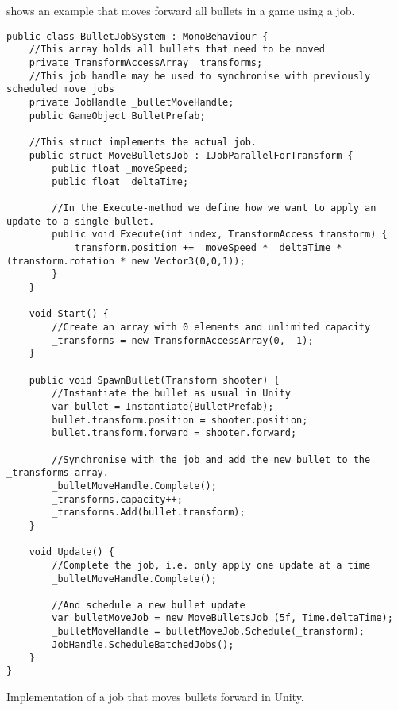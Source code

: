  shows an example that moves forward all bullets in a game using a job.
\begin{listing}[H]
\begin{verbatim}
public class BulletJobSystem : MonoBehaviour {
    //This array holds all bullets that need to be moved
    private TransformAccessArray _transforms;
    //This job handle may be used to synchronise with previously scheduled move jobs
    private JobHandle _bulletMoveHandle;
    public GameObject BulletPrefab;

    //This struct implements the actual job.
    public struct MoveBulletsJob : IJobParallelForTransform {
        public float _moveSpeed;
        public float _deltaTime;

        //In the Execute-method we define how we want to apply an update to a single bullet.
        public void Execute(int index, TransformAccess transform) {
            transform.position += _moveSpeed * _deltaTime * (transform.rotation * new Vector3(0,0,1));
        }
    }

    void Start() {
        //Create an array with 0 elements and unlimited capacity
        _transforms = new TransformAccessArray(0, -1);
    }

    public void SpawnBullet(Transform shooter) {
        //Instantiate the bullet as usual in Unity
        var bullet = Instantiate(BulletPrefab);
        bullet.transform.position = shooter.position;
        bullet.transform.forward = shooter.forward;

        //Synchronise with the job and add the new bullet to the _transforms array.
        _bulletMoveHandle.Complete();
        _transforms.capacity++;
        _transforms.Add(bullet.transform);
    }

    void Update() {
        //Complete the job, i.e. only apply one update at a time
        _bulletMoveHandle.Complete();

        //And schedule a new bullet update
        var bulletMoveJob = new MoveBulletsJob (5f, Time.deltaTime);
        _bulletMoveHandle = bulletMoveJob.Schedule(_transform);
        JobHandle.ScheduleBatchedJobs();
    }
}
\end{verbatim}
\caption{Implementation of a job that moves bullets forward in Unity.} \label{lst:unity:job:example}
\end{listing}


